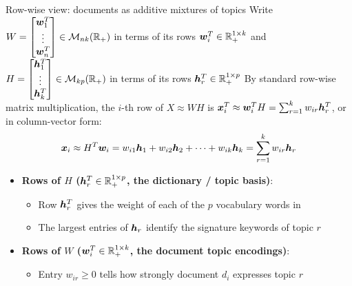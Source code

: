 \documentclass[aspectratio=169]{beamer}\usepackage[]{graphicx}\usepackage[]{xcolor}
\begin{document}

\begin{frame}{Row-wise view: documents as additive mixtures of topics}
Write $W = \begin{bmatrix} \bm{w}_1^T \\ \vdots \\ \bm{w}_n^T \end{bmatrix} \in \mathcal{M}_{nk}(\mathbb{R}_+)$ in terms of its rows $\bm{w}_i^T \in \mathbb{R}_+^{1 \times k}$ and $H = \begin{bmatrix} \bm{h}_1^T \\ \vdots \\ \bm{h}_k^T \end{bmatrix} \in \mathcal{M}_{kp}(\mathbb{R}_+)$ in terms of its rows $\bm{h}_r^T \in \mathbb{R}_+^{1 \times p}$
\vfill
By standard row-wise matrix multiplication, the $i$-th row of $X \approx W H$ is $\bm{x}_i^T \approx \bm{w}_i^T H = \sum_{r=1}^k w_{ir} \bm{h}_r^T$, or in column-vector form:
\[
\bm{x}_i \approx H^T \bm{w}_i = w_{i1} \bm{h}_1 + w_{i2} \bm{h}_2 + \cdots + w_{ik} \bm{h}_k = \sum_{r=1}^k w_{ir} \bm{h}_r
\]
\vfill
\begin{itemize}
\item \textbf{Rows of $H$ ($\bm{h}_r^T \in \mathbb{R}_+^{1 \times p}$, the dictionary / topic basis)}:
\begin{itemize}
\item Row $\bm{h}_r^T$ gives the weight of each of the $p$ vocabulary words in 
\item The largest entries of $\bm{h}_r$ identify the signature keywords of topic $r$
\end{itemize}
\vfill
\item \textbf{Rows of $W$ ($\bm{w}_i^T \in \mathbb{R}_+^{1 \times k}$, the document topic encodings)}:
\begin{itemize}
\item Entry $w_{ir} \ge 0$ tells how strongly document $d_i$ expresses topic $r$
\end{itemize}
\end{itemize}
\end{frame}
\end{document}
